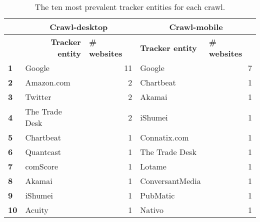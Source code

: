 \begin{table}[ht] 
\caption{The ten most prevalent tracker entities for each crawl.} 
\centering 
\begin{tabular}{|l|ll|ll|} 
\hline\textbf{} & \multicolumn{2}{c|}{\textbf{Crawl-desktop}} & \multicolumn{2}{c|}{\textbf{Crawl-mobile}} \\ \hline 
& \multicolumn{1}{r|}{\textbf{Tracker entity}} & \textbf{\# websites} & \multicolumn{1}{l|}{\textbf{Tracker entity}} & \textbf{\# websites} \\ \hline 
\textbf{1} & \multicolumn{1}{l|}{Google} & \multicolumn{1}{r|}{11} & \multicolumn{1}{l|}{Google} & \multicolumn{1}{r|}{7} \\ \hline 
\textbf{2} & \multicolumn{1}{l|}{Amazon.com} & \multicolumn{1}{r|}{2} & \multicolumn{1}{l|}{Chartbeat} & \multicolumn{1}{r|}{1} \\ \hline 
\textbf{3} & \multicolumn{1}{l|}{Twitter} & \multicolumn{1}{r|}{2} & \multicolumn{1}{l|}{Akamai} & \multicolumn{1}{r|}{1} \\ \hline 
\textbf{4} & \multicolumn{1}{l|}{The Trade Desk} & \multicolumn{1}{r|}{2} & \multicolumn{1}{l|}{iShumei} & \multicolumn{1}{r|}{1} \\ \hline 
\textbf{5} & \multicolumn{1}{l|}{Chartbeat} & \multicolumn{1}{r|}{1} & \multicolumn{1}{l|}{Connatix.com} & \multicolumn{1}{r|}{1} \\ \hline 
\textbf{6} & \multicolumn{1}{l|}{Quantcast} & \multicolumn{1}{r|}{1} & \multicolumn{1}{l|}{The Trade Desk} & \multicolumn{1}{r|}{1} \\ \hline 
\textbf{7} & \multicolumn{1}{l|}{comScore} & \multicolumn{1}{r|}{1} & \multicolumn{1}{l|}{Lotame} & \multicolumn{1}{r|}{1} \\ \hline 
\textbf{8} & \multicolumn{1}{l|}{Akamai} & \multicolumn{1}{r|}{1} & \multicolumn{1}{l|}{ConversantMedia} & \multicolumn{1}{r|}{1} \\ \hline 
\textbf{9} & \multicolumn{1}{l|}{iShumei} & \multicolumn{1}{r|}{1} & \multicolumn{1}{l|}{PubMatic} & \multicolumn{1}{r|}{1} \\ \hline 
\textbf{10} & \multicolumn{1}{l|}{Acuity} & \multicolumn{1}{r|}{1} & \multicolumn{1}{l|}{Nativo} & \multicolumn{1}{r|}{1} \\ \hline 
\end{tabular} 
\label{tab:TrackerEntityTop10} 
\end{table}